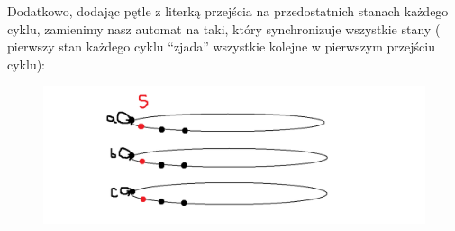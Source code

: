 \documentclass[a4paper,11pt]{article}
\begin{document}
Dodatkowo, dodając pętle z literką przejścia na przedostatnich stanach każdego cyklu, zamienimy nasz automat na taki, który
synchronizuje wszystkie stany ( pierwszy stan każdego cyklu ``zjada'' wszystkie kolejne w pierwszym przejściu cyklu):
\begin{figure}[h!]
  \centerline{%
    \includegraphics[width=18cm]{zad42_4.png}%
  }%
\end{figure}
\end{document}
